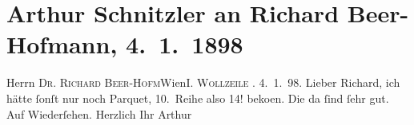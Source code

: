 

         
         \renewcommand{\erwaehntePersonen}{Personen: Richard Beer-Hofmann}
         \renewcommand{\erwaehnteOrte}{Orte: Wien, Wollzeile}
         \renewcommand{\erwaehnteWerke}{}
               \section[Arthur Schnitzler an Richard Beer-Hofmann, 4. 1. 1898]{ Arthur Schnitzler an Richard Beer-Hofmann, 4. 1. 1898}\nopagebreak{}\rehead{ }\begin{ledgroupsized}[t]{13cm}\normalsize\beginnumbering{} \toendnotes[C]{\smallbreak\pagebreak[2]} 
\pstart{}{\pb}Herrn \textsc{Dr. Richard
                        Beer-Hofm}\pend{}\pstart{}Wien\pend{}\pstart{}\textsc{I. Wollzeile{ }}.\pend{}{\bigskip}\pstart
           \raggedleft{}{\pb}4. 1. 98.\pend
           \pstart
           Lieber Richard, ich hätte ſonſt nur noch Parquet, 10. Reihe also 14!
                  beko{\geminationm}en. Die da ſind ſehr gut. Auf Wiederſehen.
               Herzlich Ihr\pend
           \pstart \spacefill\mbox{Arthur}\pend{}
         
         \endnumbering{}\end{ledgroupsized}  \newcommand{\dateiname}{L00758}\newcommand{\titel}{Arthur Schnitzler an Richard Beer-Hofmann, 4. 1. 1898}\newcommand{\editorInnen}{Martin Anton Müller und Gerd-Hermann Susen}
      